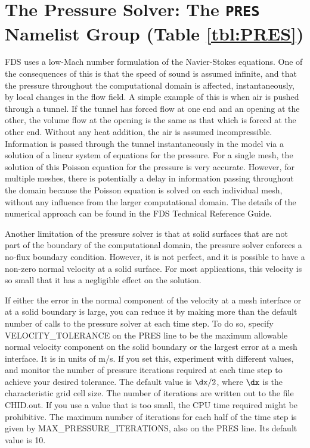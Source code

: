 \documentclass[11pt]{book}
\begin{document}
\section{The Pressure Solver: The \texorpdfstring{{\tt PRES}}{PRES} Namelist Group (Table \ref{tbl:PRES})}
\label{info:PRES}

FDS uses a low-Mach number formulation of the Navier-Stokes equations. One of the consequences of this is that the speed of sound is
assumed infinite, and that the pressure throughout the computational domain is affected, instantaneously, by local changes in the flow field. A simple example of
this is when air is pushed through a tunnel. If the tunnel has forced flow at one end and an opening at the other, the volume flow at the opening is the same
as that which is forced at the other end. Without any heat addition, the air is assumed incompressible. Information is passed through the tunnel
instantaneously in the model via a solution of a linear system of equations for the pressure. For a single mesh, the solution of this Poisson equation for
the pressure is very accurate. However, for multiple meshes, there is potentially a delay in information passing throughout the domain because the Poisson
equation is solved on each individual mesh, without any influence from the larger computational domain. The details of the numerical approach can be found in the
FDS Technical Reference Guide.


Another limitation of the pressure solver is that at solid surfaces that are not part of the boundary of the computational domain,
the pressure solver enforces a no-flux boundary condition. However, it is not perfect, and
it is possible to have a non-zero normal velocity at a solid surface. For most applications, this velocity is so small that it has a negligible effect on the solution.

If either the error in the normal component of the velocity at a mesh interface or at a solid boundary is large, you
can reduce it by making more than the default number of calls to the pressure solver at each time step.
To do so, specify {\ct VELOCITY\_TOLERANCE} on the {\ct PRES} line to be the maximum allowable normal velocity component on the solid
boundary or the largest error at a mesh interface. It is in units of m/s.
If you set this, experiment with different values, and monitor the number of pressure iterations required at each time step to achieve your
desired tolerance. The default value is $\dx/2$, where $\dx$ is the characteristic grid cell size.
The number of iterations are written out to the file {\ct CHID.out}. If you use a value that is too small, the CPU time required might be prohibitive.
The maximum number of iterations for each half of the time step is given by {\ct MAX\_PRESSURE\_ITERATIONS}, also on the {\ct PRES} line. Its default value is 10.
\end{document}
